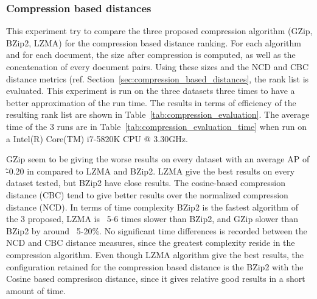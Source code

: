 \subsubsection{Compression based distances}

This experiment try to compare the three proposed compression algorithm (GZip, BZip2, LZMA) for the compression based distance ranking.
For each algorithm and for each document, the size after compression is computed, as well as the concatenation of every document pairs.
Using these sizes and the NCD and CBC distance metrics (ref. Section~\ref{sec:compression_based_distances}, the rank list is evaluated.
This experiment is run on the three datasets three times to have a better approximation of the run time.
The results in terms of efficiency of the resulting rank list are shown in Table~\ref{tab:compression_evaluation}.
The average time of the 3 runs are in Table~\ref{tab:compression_evaluation_time} when run on a Intel(R) Core(TM) i7-5820K CPU @ 3.30GHz.

GZip seem to be giving the worse results on every dataset with an average AP of \~-0.20 in compared to LZMA and BZip2.
LZMA give the best results on every dataset tested, but BZip2 have close results.
The cosine-based compression distance (CBC) tend to give better results over the normalized compression distance (NCD).
In terms of time complexity BZip2 is the fastest algorithm of the 3 proposed, LZMA is ~5-6 times slower than BZip2, and GZip slower than BZip2 by around ~5-20\%.
No significant time differences is recorded between the NCD and CBC distance measures, since the greatest complexity reside in the compression algorithm.
Even though LZMA algorithm give the best results, the configuration retained for the compression based distance is the BZip2 with the Cosine based compresison distance, since it gives relative good results in a short amount of time.

